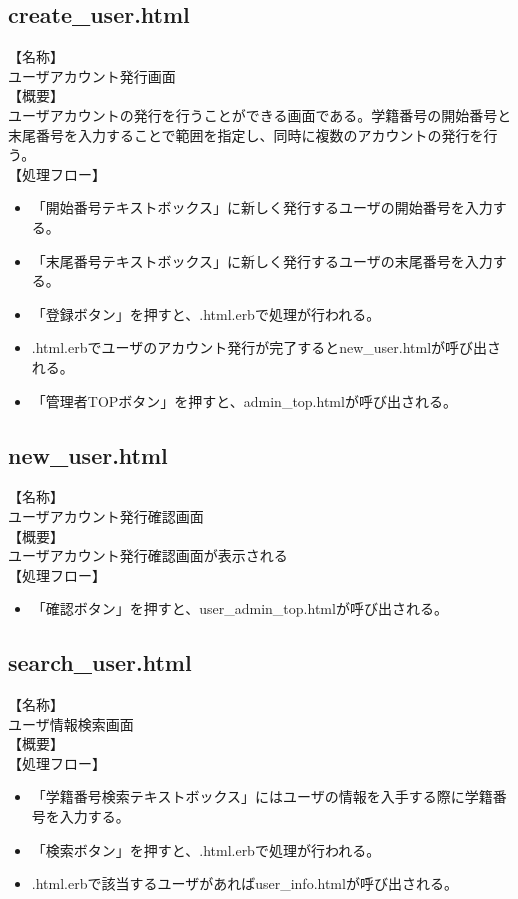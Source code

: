 \documentclass[a4j]{jarticle}
\begin{document}
\subsection{create\_user.html}
\noindent
【名称】\\
ユーザアカウント発行画面\\
【概要】\\
ユーザアカウントの発行を行うことができる画面である。学籍番号の開始番号と末尾番号を入力することで範囲を指定し、同時に複数のアカウントの発行を行う。\\
【処理フロー】
\begin{itemize}
\item 「開始番号テキストボックス」に新しく発行するユーザの開始番号を入力する。
\item 「末尾番号テキストボックス」に新しく発行するユーザの末尾番号を入力する。
\item 「登録ボタン」を押すと、.html.erbで処理が行われる。
\item .html.erbでユーザのアカウント発行が完了するとnew\_user.htmlが呼び出される。
\item 「管理者TOPボタン」を押すと、admin\_top.htmlが呼び出される。
\end{itemize}

\subsection{new\_user.html}
\noindent
【名称】\\
ユーザアカウント発行確認画面\\
【概要】\\
ユーザアカウント発行確認画面が表示される\\
【処理フロー】
\begin{itemize}
\item 「確認ボタン」を押すと、user\_admin\_top.htmlが呼び出される。
\end{itemize}

\subsection{search\_user.html}
\noindent
【名称】\\
ユーザ情報検索画面\\
【概要】\\
【処理フロー】
\begin{itemize}
\item 「学籍番号検索テキストボックス」にはユーザの情報を入手する際に学籍番号を入力する。
\item 「検索ボタン」を押すと、.html.erbで処理が行われる。
\item .html.erbで該当するユーザがあればuser\_info.htmlが呼び出される。
\end{itemize}
\end{document}
